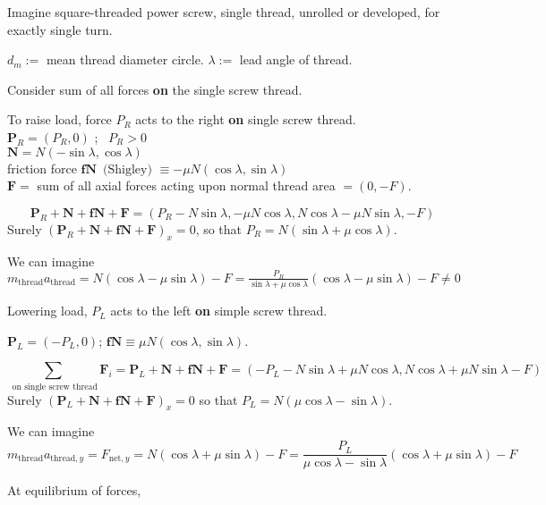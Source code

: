\documentclass[10pt]{amsart}
\begin{document}
\begin{multicols*}{2}
Imagine square-threaded power screw, single thread, unrolled or developed, for exactly single turn.  

$d_m:= $ mean thread diameter circle.  $\lambda := $ lead angle of thread.  

Consider sum of all forces \textbf{on} the single screw thread.  

To raise load, force $P_R$ acts to the right \textbf{on} single screw thread.   \\
$\mathbf{P}_R = (P_R,0)$ ; \, $P_R >0$ \\
$\mathbf{N}= N (-\sin{\lambda}, \cos{\lambda} )$  \\ 
friction force $\mathbf{fN} \, \text{ (Shigley) } \equiv - \mu N(\cos{\lambda}, \sin{\lambda})$ \\
$\mathbf{F} =$ sum of all axial forces acting upon normal thread area $=(0,-F)$.  

\begin{equation}
	\mathbf{P}_R + \mathbf{N} + \mathbf{fN} + \mathbf{F} = (P_R-N\sin{\lambda} , - \mu N \cos{\lambda}, N\cos{\lambda} - \mu N\sin{\lambda}, -F)
\end{equation}
Surely $(\mathbf{P}_R + \mathbf{N} + \mathbf{fN} + \mathbf{F})_x =0$, so that $P_R = N( \sin{\lambda} + \mu \cos{\lambda})$.  

We can imagine $m_{\text{thread}} a_{\text{thread}} = N (\cos{\lambda} - \mu \sin{\lambda}) -F = \frac{P_R}{ \sin{\lambda} + \mu \cos{\lambda} }(\cos{\lambda} - \mu\sin{\lambda} ) -F \neq 0 $

Lowering load, $P_L$ acts to the left \textbf{on} simple screw thread.  

$\mathbf{P}_L = (-P_L ,0)$; $\mathbf{fN} \equiv \mu N(\cos{\lambda}, \sin{\lambda})$.  

\begin{equation}
\sum_{\text{ on single screw thread} } \mathbf{F}_i = \mathbf{P}_L + \mathbf{N} + \mathbf{fN} + \mathbf{F} = (-P_L - N\sin{\lambda} + \mu N \cos{\lambda}, N\cos{\lambda} + \mu N \sin{\lambda} - F)
\end{equation}
Surely $(\mathbf{P}_L + \mathbf{N} + \mathbf{fN} + \mathbf{F})_x =0$ so that $P_L = N(\mu \cos{\lambda} - \sin{\lambda} )$.  

We can imagine 
\[
m_{\text{thread}} a_{\text{thread},y} = F_{\text{net},y} = N(\cos{\lambda} + \mu \sin{\lambda}) - F = \frac{ P_L}{ \mu \cos{\lambda} - \sin{\lambda} } (\cos{\lambda} +\mu \sin{\lambda} ) - F
\]

At equilibrium of forces,


\end{multicols*}
\end{document}
